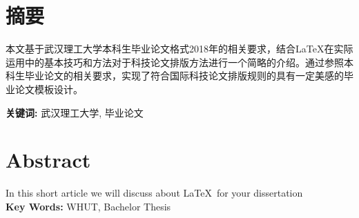 \section*{ \centering 摘要}

\vskip0.5cm
本文基于武汉理工大学本科生毕业论文格式2018年的相关要求，结合\LaTeX 在实际运用中的基本技巧和方法对于科技论文排版方法进行一个简略的介绍。通过参照本科生毕业论文的相关要求，实现了符合国际科技论文排版规则的具有一定美感的毕业论文模板设计。 


\textbf{关键词:}  武汉理工大学, 毕业论文 

\clearpage
\section*{ \centering \textbf{Abstract} }

In this short article we will discuss about \LaTeX\,  for your dissertation \\

\textbf{Key Words:} WHUT, Bachelor Thesis




